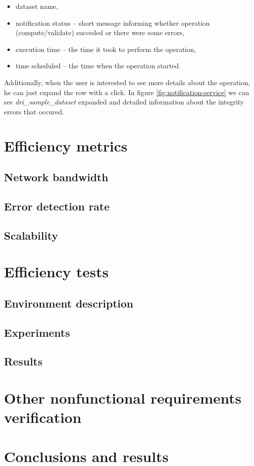 \begin{itemize}
\item dataset name,
\item notification status -- short message informing whether operation
(compute/validate) succeded or there were some errors,
\item execution time -- the time it took to perform the operation,
\item time scheduled -- the time when the operation started.
\end{itemize}

Additionally, when the user is interested to see more details about the operation,
he can just expand the row with a click. In figure \ref{fig:notification-service}
we can see \textit{dri\_sample\_dataset} expanded and detailed information about the
integrity errors that occured.

	\section{Efficiency metrics}
		\subsection{Network bandwidth}
		\subsection{Error detection rate}
		\subsection{Scalability}
	\section{Efficiency tests}
		\subsection{Environment description}
		\subsection{Experiments}
		\subsection{Results}
	\section{Other nonfunctional requirements verification}
	\section{Conclusions and results}
